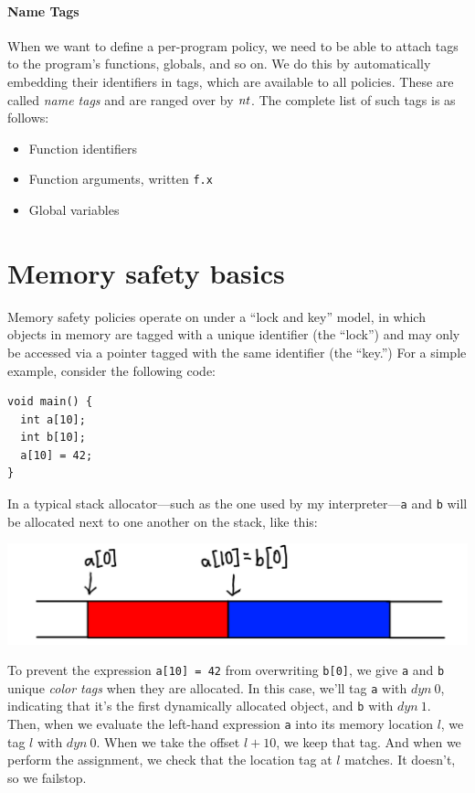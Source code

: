 \documentclass{article}
\begin{document}
\paragraph*{Name Tags}

When we want to define a per-program policy, we need to be able to attach tags to the program's
functions, globals, and so on. We do this by automatically embedding their identifiers in tags,
which are available to all policies. These are called {\em name tags} and are ranged over by
\(\mathit{nt}\). The complete list of such tags is as follows:
\begin{itemize}
\item Function identifiers
\item Function arguments, written {\tt f.x}
\item Global variables
\end{itemize}

\section{Memory safety basics}

Memory safety policies operate on under a ``lock and key'' model, in which objects in memory
are tagged with a unique identifier (the ``lock'') and may only be accessed via a pointer tagged
with the same identifier (the ``key.'') For a simple example, consider the following code:
%
\vspace{\abovedisplayskip}
\begin{verbatim}
void main() {
  int a[10];
  int b[10];
  a[10] = 42;    
}
\end{verbatim}
\vspace{\belowdisplayskip}
%
In a typical stack allocator---such as the one used by my interpreter---{\tt a} and {\tt b} will
be allocated next to one another on the stack, like this:

\includegraphics[width=.5\textwidth]{example.png}

To prevent the expression {\tt a[10] = 42} from overwriting {\tt b[0]}, we give {\tt a} and {\tt b}
unique {\it color tags} when they are allocated. In this case, we'll tag {\tt a} with \(\mathit{dyn ~ 0}\),
indicating that it's the first dynamically allocated object, and {\tt b} with \(\mathit{dyn ~ 1}\).
Then, when we evaluate the left-hand expression {\tt a} into its memory location \(l\), we tag
\(l\) with \(\mathit{dyn ~ 0}\). When we take the offset \(l + 10\), we keep that tag. And when we
perform the assignment, we check that the location tag at \(l\) matches. It doesn't, so we failstop.
\end{document}
